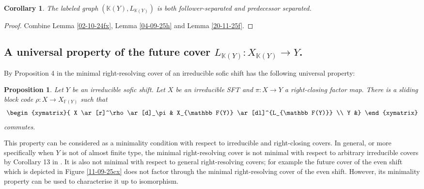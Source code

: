 \documentclass[12pt,oneside,english]{amsart}
\newtheorem{corollary}[thm]{Corollary}
\newtheorem{prop}[thm]{Proposition}
\begin{document}
\begin{corollary}\label{19-10-25a} The labeled graph $(\mathbb K(Y),L_{\mathbb K(Y)})$ is both follower-separated and predecessor separated.
\end{corollary}
\begin{proof} Combine Lemma \ref{02-10-24fx}, Lemma \ref{04-09-25h} and Lemma \ref{20-11-25f}.
\end{proof}

\subsection{A universal property of the future cover $L_{\mathbb K(Y)} : X_{\mathbb K(Y)} \to Y$.}

By Proposition 4 in \cite{BKM} the minimal right-resolving cover of an irreducible sofic shift has the following universal property:

\begin{prop}\label{20-11-25} Let $Y$ be an irreducible sofic shift. Let $X$ be an irreducible SFT and $\pi : X \to Y$ a right-closing factor map. There is a sliding block code $\rho : X \to X_{\mathbb F(Y)}$ such that
\begin{equation*}
\begin{xymatrix}{
 X \ar[r]^\rho \ar[d]_\pi  & X_{\mathbb F(Y)} \ar[dl]^{L_{\mathbb F(Y)}} \\
  Y &}
\end{xymatrix}
\end{equation*}
commutes.
\end{prop}

This property can be considered as a minimality condition with respect to irreducible and right-closing covers. In general, or more specifically when $Y$ is not of almost finite type, the minimal right-resolving cover is not minimal with respect to arbitrary irreducible covers by Corollary 13 in \cite{BKM}. It is also not minimal with respect to general right-resolving covers; for example the future cover of the even shift which is depicted in Figure \ref{11-09-25cx} does not factor through the minimal right-resolving cover of the even shift. However, its minimality property can be used to characterise it up to isomorphism.
\end{document}
